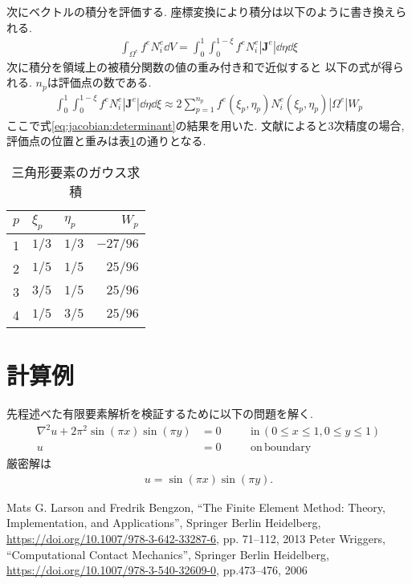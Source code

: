 \documentclass[paper=a4]{jlreq}
\begin{document}
次にベクトルの積分を評価する. 座標変換により積分は以下のように書き換えられる.
\begin{align}
    \int_{\Omega^e} f^eN_i^e\dd{V}
    = \int_0^1\int_0^{1-\xi}f^eN_i^e|\bm{J}^e|\dd{\eta}\dd{\xi} 
\end{align}
次に積分を領域上の被積分関数の値の重み付き和で近似すると
以下の式が得られる. $n_p$は評価点の数である.
\begin{align}
    \int_0^1\int_0^{1-\xi}f^eN_i^e|\bm{J}^e|\dd{\eta}\dd{\xi} 
    \approx 2\sum_{p=1}^{n_p}f^e(\xi_p,\eta_p)N_i^e(\xi_p,\eta_p)|\Omega^e|W_p
\end{align}
ここで式\eqref{eq:jacobian:determinant}の結果を用いた.
文献\cite{Wriggers2006}によると3次精度の場合,
評価点の位置と重みは表\ref{tab:gauss_quadrature}の通りとなる.
\begin{table}[htbp]
    \centering
    \caption{三角形要素のガウス求積}
    \label{tab:gauss_quadrature}
    \begin{tabular}{lllr}
        \hline
        $p$ & $\xi_p$ &  $\eta_p$ & $W_p$ \\ \hline
        1 & $1/3$ & $1/3$ & $-27/96$ \\
        2 & $1/5$ & $1/5$ & $25/96$ \\
        3 & $3/5$ & $1/5$ & $25/96$ \\
        4 & $1/5$ & $3/5$ & $25/96$ \\ \hline
    \end{tabular}
\end{table}


\section{計算例}
先程述べた有限要素解析を検証するために以下の問題を解く.
\begin{alignat}{4}
    \nabla^2 u + 2\pi^2\sin(\pi x)\sin(\pi y) &= 0 &\quad& \mathrm{in}\, (0\leq x \leq 1, 0\leq y\leq 1) \\
    u &= 0 &\quad& \mathrm{on\,boundary}
\end{alignat}
厳密解は
\begin{align}
    u = \sin(\pi x)\sin(\pi y).
\end{align}

\begin{thebibliography}{9}
     Mats G. Larson and Fredrik Bengzon, ``The Finite Element Method: Theory,  Implementation,  and Applications'', Springer Berlin Heidelberg, \url{https://doi.org/10.1007/978-3-642-33287-6}, pp. 71--112, 2013
     Peter Wriggers, ``Computational Contact Mechanics'', Springer Berlin Heidelberg, \url{https://doi.org/10.1007/978-3-540-32609-0}, pp.473--476, 2006 
\end{thebibliography}
\end{document}
